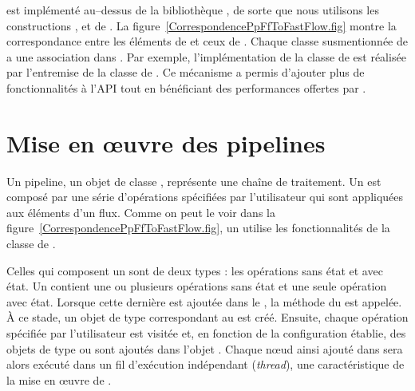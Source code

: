 \ppff{} est impl\'ement\'e au--dessus de la biblioth\`eque , de sorte que nous utilisons les constructions ,  et  de . La figure~\ref{CorrespondencePpFfToFastFlow.fig} montre la correspondance entre les \'el\'ements de  et ceux de . Chaque classe susmentionn\'ee de  a une association dans . Par exemple, l'impl\'ementation de la classe  de  est r\'ealis\'ee par l'entremise de la classe  de . Ce m\'ecanisme a permis d'ajouter plus de fonctionnalit\'es \`a l'API tout en b\'en\'eficiant des performances offertes par .






\section{Mise en \oe{}uvre des pipelines}

Un pipeline, un objet de classe , repr\'esente une cha\^ine de traitement. Un  est compos\'e par une s\'erie d'op\'erations sp\'ecifi\'ees par l'utilisateur qui sont appliqu\'ees aux \'el\'ements d'un flux. Comme on peut le voir dans la figure~\ref{CorrespondencePpFfToFastFlow.fig}, un  utilise les fonctionnalit\'es de la classe  de . 

Celles qui composent un  sont de deux types : les op\'erations sans \'etat et avec \'etat. Un  contient une ou plusieurs op\'erations sans \'etat et une seule op\'eration avec \'etat. Lorsque cette derni\`ere est ajout\'ee dans le , la m\'ethode  du  est appel\'ee. \`A ce stade, un objet de type  correspondant au  est cr\'e\'e. Ensuite, chaque op\'eration sp\'ecifi\'ee par l'utilisateur est visit\'ee et, en fonction de la configuration \'etablie, des objets de type  ou  sont ajout\'es dans l'objet . Chaque nœud ainsi ajout\'e dans  sera alors ex\'ecut\'e dans un fil d'ex\'ecution ind\'ependant (\emph{thread}), une caract\'eristique de la mise en \oe{}uvre de .


